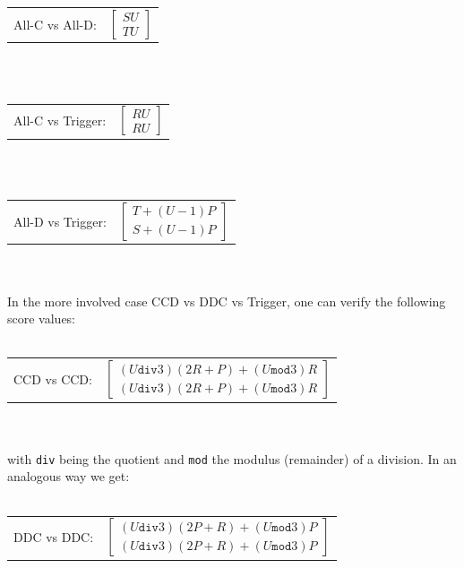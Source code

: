 \documentclass[12pt]{report}
\begin{document}
\\\\
\begin{tabular}{c l}
All-C vs All-D: & $\begin{bmatrix}
    SU\\
    TU
\end{bmatrix}$\\
\end{tabular}
\\\\
\begin{tabular}{c l}
All-C vs Trigger: & $\begin{bmatrix}
    RU\\
    RU
\end{bmatrix}$\\
\end{tabular}
\\\\
\begin{tabular}{c l}
All-D vs Trigger: & $\begin{bmatrix}
    T+(U-1)P\\
    S+(U-1)P
\end{bmatrix}$\\
\end{tabular}
\\\\
In the more involved case CCD vs DDC vs Trigger, one can verify the following score values:
\\\\
\begin{tabular}{c l}
CCD vs CCD: & $\begin{bmatrix}
    (U\texttt{div}3)(2R+P)+(U\texttt{mod}3)R\\
    (U\texttt{div}3)(2R+P)+(U\texttt{mod}3)R
\end{bmatrix}$\\
\end{tabular}
\\\\
with \texttt{div} being the quotient and \texttt{mod} the modulus (remainder) of a division. In an analogous way we get:
\\\\
\begin{tabular}{c l}
DDC vs DDC: & $\begin{bmatrix}
    (U\texttt{div}3)(2P+R)+(U\texttt{mod}3)P\\
    (U\texttt{div}3)(2P+R)+(U\texttt{mod}3)P
\end{bmatrix}$\\
\end{tabular}
\end{document}
